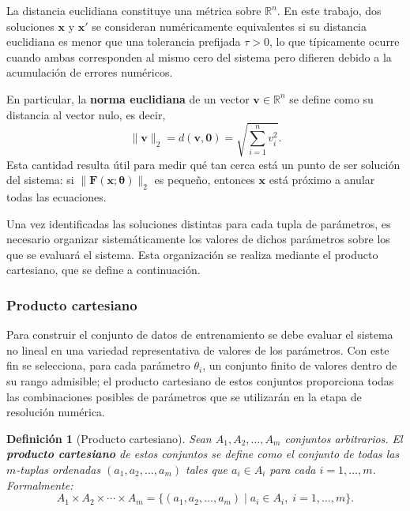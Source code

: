 \documentclass[12pt,a4paper]{article} \usepackage[utf8]{inputenc} \usepackage[spanish]{babel} \usepackage{amsmath, amssymb, amsthm} \usepackage{bm} \usepackage{float} \usepackage{longtable} \usepackage[hidelinks]{hyperref}
\newtheorem{definition}{Definición} \newtheorem{theorem}{Teorema} \newtheorem{remark}{Observación} \newcounter{pseudocode}
\newcommand{\xvec}{\mathbf{x}} \newcommand{\thetavec}{\boldsymbol{\theta}} \newcommand{\Fvec}{\mathbf{F}} \newcommand{\R}{\mathbb{R}} \newcommand{\norm}[1]{\left\lVert#1\right\rVert} \newcommand{\loss}{\mathcal{L}} \newcommand{\dataset}{\mathcal{D}} \newcommand{\jac}{\mathbf{J}}
\begin{document}
La distancia euclidiana constituye una métrica sobre \(\R^n\). En este trabajo, dos soluciones \(\xvec\) y \(\xvec'\) se consideran numéricamente equivalentes si su distancia euclidiana es menor que una tolerancia prefijada \(\tau > 0\), lo que típicamente ocurre cuando ambas corresponden al mismo cero del sistema pero difieren debido a la acumulación de errores numéricos.

En particular, la \textbf{norma euclidiana} de un vector \(\mathbf{v}\in\R^n\) se define como su distancia al vector nulo, es decir,
\begin{equation}
\|\mathbf{v}\|_2 = d(\mathbf{v}, \mathbf{0}) = \sqrt{\sum_{i=1}^{n} v_i^2}. \label{eq:norma_euclidiana}
\end{equation}
Esta cantidad resulta útil para medir qué tan cerca está un punto de ser solución del sistema: si \(\|\mathbf{F}(\mathbf{x}; \boldsymbol{\theta})\|_2\) es pequeño, entonces \(\mathbf{x}\) está próximo a anular todas las ecuaciones.

Una vez identificadas las soluciones distintas para cada tupla de parámetros, es necesario organizar sistemáticamente los valores de dichos parámetros sobre los que se evaluará el sistema. Esta organización se realiza mediante el producto cartesiano, que se define a continuación.

\subsubsection{Producto cartesiano}

Para construir el conjunto de datos de entrenamiento se debe evaluar el sistema no lineal en una variedad representativa de valores de los parámetros. Con este fin se selecciona, para cada parámetro \(\theta_i\), un conjunto finito de valores dentro de su rango admisible; el producto cartesiano de estos conjuntos proporciona todas las combinaciones posibles de parámetros que se utilizarán en la etapa de resolución numérica.

\begin{definition}[Producto cartesiano]
Sean \(A_1, A_2, \dots, A_m\) conjuntos arbitrarios. El \textbf{producto cartesiano} de estos conjuntos se define como el conjunto de todas las \(m\)-tuplas ordenadas \((a_1, a_2, \dots, a_m)\) tales que \(a_i \in A_i\) para cada \(i = 1, \dots, m\). Formalmente:
\begin{equation}
A_1 \times A_2 \times \cdots \times A_m = \{(a_1, a_2, \dots, a_m) \mid a_i \in A_i,\; i=1,\dots,m\}.
\end{equation}
\end{definition}
\end{document}
